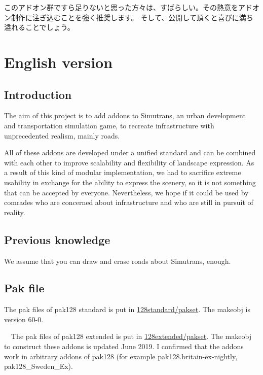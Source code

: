 \documentclass{jarticle}
\begin{document}
\vspace{15pt}
このアドオン群ですら足りないと思った方々は、すばらしい。その熱意をアドオン制作に注ぎ込むことを強く推奨します。
そして、公開して頂くと喜びに満ち溢れることでしょう。

\newpage

\section{English version}

\subsection{Introduction}

The aim of this project is to add addons to Simutrans, an urban development and transportation simulation game, to recreate infrastructure with unprecedented realism, mainly roads.

All of these addons are developed under a unified standard and can be combined with each other to improve scalability and flexibility of landscape expression.
As a result of this kind of modular implementation, we had to sacrifice extreme usability in exchange for the ability to express the scenery, so it is not something that can be accepted by everyone.
Nevertheless, we hope if it could be used by comrades who are concerned about infrastructure and who are still in pursuit of reality.

\subsection*{Previous knowledge}

We assume that you can draw and erase roads about Simutrans, enough.

\subsection*{Pak file}

The pak files of pak128 standard is put in \href{https://github.com/anoKTOK/Yokubari_roads_set_ver_anoKTOK/tree/main/128standard/pakset}{128standard/pakset}.
The makeobj is version 60-0.

　The pak files of pak128 extended is put in \href{https://github.com/anoKTOK/Yokubari_roads_set_ver_anoKTOK/tree/main/128extended/pakset}{128extended/pakset}.
 The makeobj to construct these addons is updated June 2019.
 I confirmed that the addons work in arbitrary addons of pak128 (for example pak128.britain-ex-nightly, pak128{\_}Sweden{\_}Ex).
\end{document}
